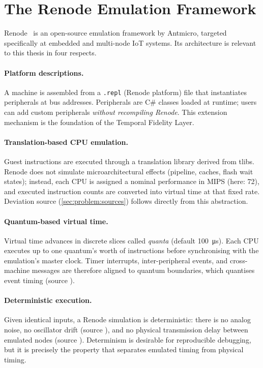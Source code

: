 \section{The Renode Emulation Framework}
\label{sec:bg:renode}

Renode~\cite{renode} is an open-source emulation framework by Antmicro,
targeted specifically at embedded and multi-node IoT systems. Its
architecture is relevant to this thesis in four respects.

\paragraph{Platform descriptions.} A machine is assembled from a
\texttt{.repl} (Renode platform) file that instantiates peripherals at
bus addresses. Peripherals are C\# classes loaded at runtime; users can
add custom peripherals \emph{without recompiling Renode}. This
extension mechanism is the foundation of the Temporal Fidelity Layer.

\paragraph{Translation-based CPU emulation.} Guest instructions are
executed through a translation library derived from tlibs. Renode does
not simulate microarchitectural effects (pipeline, caches, flash wait
states); instead, each CPU is assigned a nominal performance in MIPS
(here: 72), and executed instruction counts are converted into virtual
time at that fixed rate. Deviation source 
(\cref{sec:problem:sources}) follows directly from this abstraction.

\paragraph{Quantum-based virtual time.} Virtual time advances in
discrete slices called \emph{quanta} (default \SI{100}{\micro\second}).
Each CPU executes up to one quantum's worth of instructions before
synchronising with the emulation's master clock. Timer interrupts,
inter-peripheral events, and cross-machine messages are therefore
aligned to quantum boundaries, which quantises event timing
(source ).

\paragraph{Deterministic execution.} Given identical inputs, a Renode
simulation is deterministic: there is no analog noise, no oscillator
drift (source ), and no physical transmission delay between
emulated nodes (source ). Determinism is desirable for
reproducible debugging, but it is precisely the property that separates
emulated timing from physical timing.

